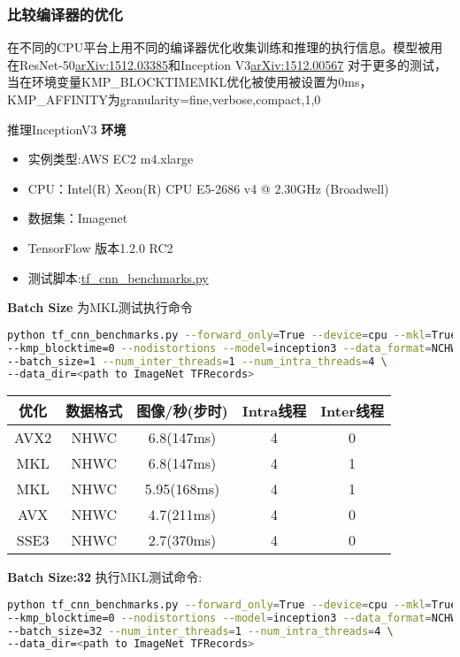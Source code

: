 \subsubsection{比较编译器的优化}
在不同的CPU平台上用不同的编译器优化收集训练和推理的执行信息。模型被用在ResNet-50\href{https://arxiv.org/abs/1512.03385}{arXiv:1512.03385}和Inception V3\href{https://arxiv.org/abs/1512.00567}{arXiv:1512.00567}
对于更多的测试，当在环境变量KMP\_BLOCKTIMEMKL优化被使用被设置为0ms，KMP\_AFFINITY为granularity=fine,verbose,compact,1,0

推理InceptionV3\newline
\textbf{环境}
\begin{itemize}
	\item 实例类型:AWS EC2 m4.xlarge
	\item CPU：Intel(R) Xeon(R) CPU E5-2686 v4 @ 2.30GHz (Broadwell)
	\item 数据集：Imagenet
	\item TensorFlow 版本1.2.0 RC2
	\item 测试脚本:\href{https://github.com/tensorflow/benchmarks/blob/mkl_experiment/scripts/tf_cnn_benchmarks/tf_cnn_benchmarks.py}{tf\_cnn\_benchmarks.py}
\end{itemize}
\textbf{Batch Size}
为MKL测试执行命令
\begin{lstlisting}[language=Bash]
python tf_cnn_benchmarks.py --forward_only=True --device=cpu --mkl=True \
--kmp_blocktime=0 --nodistortions --model=inception3 --data_format=NCHW \
--batch_size=1 --num_inter_threads=1 --num_intra_threads=4 \
--data_dir=<path to ImageNet TFRecords>
\end{lstlisting}

\begin{tabular}{|c|c|c|c|c|}
\hline
优化&数据格式&图像/秒(步时)&Intra线程&Inter线程\\
\hline
AVX2&NHWC&6.8(147ms)&4&0\\
\hline
MKL&NHWC&6.8(147ms)&4&1\\
\hline
MKL&NHWC&5.95(168ms)&4&1\\
\hline
AVX&NHWC&4.7(211ms)&4&0\\
\hline
SSE3&NHWC&2.7(370ms)&4&0\\
\hline
\end{tabular}

\textbf{Batch Size:32}
执行MKL测试命令:
\begin{lstlisting}[language=Bash]
python tf_cnn_benchmarks.py --forward_only=True --device=cpu --mkl=True \
--kmp_blocktime=0 --nodistortions --model=inception3 --data_format=NCHW \
--batch_size=32 --num_inter_threads=1 --num_intra_threads=4 \
--data_dir=<path to ImageNet TFRecords>
\end{lstlisting}

